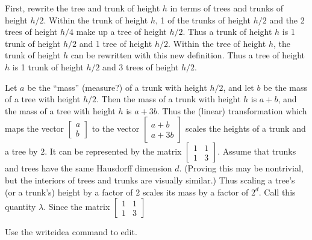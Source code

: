 \documentclass{article}
\begin{document}

First, rewrite the tree and trunk of height $h$
in terms of trees and trunks of height $h/2$.
Within the trunk of height $h$,
1 of the trunks of height $h/2$
and the 2 trees of height $h/4$
make up a tree of height $h/2$.
Thus a trunk of height $h$ is
1 trunk of height $h/2$
and 1 tree of height $h/2$.
Within the tree of height $h$,
the trunk of height $h$
can be rewritten with this new definition.
Thus a tree of height $h$ is
1 trunk of height $h/2$
and 3 trees of height $h/2$.

Let $a$ be
the ``mass'' (measure?) of a trunk with height $h/2$,
and let $b$ be
the mass of a tree with height $h/2$.
Then the mass of a trunk with height $h$ is $a+b$,
and the mass of a tree with height $h$ is $a+3b$.
Thus the (linear) transformation which maps
the vector $\begin{bmatrix} a\\b \end{bmatrix}$
to the vector $\begin{bmatrix} a+b\\a+3b \end{bmatrix}$
scales the heights of a trunk and a tree by $2$.
It can be represented by
the matrix $\begin{bmatrix} 1&1\\1&3 \end{bmatrix}$.
Assume that trunks and trees have the same Hausdorff dimension $d$.
(Proving this may be nontrivial, but
the interiors of trees and trunks are visually similar.)
Thus scaling a tree's (or a trunk's) height by a factor of $2$
scales its mass by a factor of $2^d$.
Call this quantity $\lambda$.
Since the matrix $\begin{bmatrix} 1&1\\1&3 \end{bmatrix}$

Use the writeidea command to edit.
\end{document}
